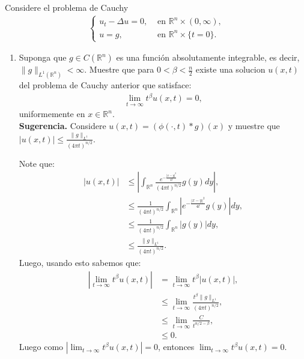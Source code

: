 \begin{homeworkProblem}
  Considere el problema de Cauchy
  \begin{align*}
    \begin{cases}
      u_t-\Delta u=0, &\text{ en } \mathbb{R}^{n}\times (0,\infty) \text{,} \\
      u=g, &\text{ en } \mathbb{R}^{n}\times\{t=0\} .
    \end{cases}
  \end{align*}
  \begin{enumerate}
    \item Suponga que $g\in C(\mathbb{R}^{n})$ es una función absolutamente integrable, es decir,$\|g\|_{L^1(\mathbb{R}^{n})}< \infty$. Muestre que para $0< \beta < \frac{n}{2}$ existe una solucion $u(x,t)$ del problema de Cauchy anterior que satisface:
    \begin{align*}
      \lim_{t\rightarrow\infty}t^{\beta}u(x,t)=0,
    \end{align*}
    uniformemente en $x\in\mathbb{R}^{n}$.\\
    \textbf{Sugerencia.} Considere $u(x,t)=(\phi(\cdot,t)*g)(x)$ y muestre que $|u(x,t)|\leq \frac{\|g\|_{L^1}}{(4\pi t)^{n/2}}$.
    \begin{solucion}
      Note que:
      \begin{align*}
        |u(x,t)|&\leq \left| \int_{\mathbb{R}^{n}}\frac{e^{-\frac{|x-y|^2}{4t}}}{(4\pi t)^{n/2}}g(y)dy \right|,\\
        &\leq \frac{1}{(4\pi t)^{n/2}}\int_{\mathbb{R}^{n}}\left| e^{-\frac{|x-y|^2}{4t}}g(y) \right|dy,\\
        &\leq \frac{1}{(4\pi t)^{n/2}}\int_{\mathbb{R}^{n}}\left| g(y) \right|dy,\\
        &\leq \frac{\|g\|_{L^1}}{(4\pi t)^{n/2}}.
      \end{align*}
      Luego, usando esto sabemos que:
      \begin{align*}
        |\lim_{t \rightarrow \infty}t^{\beta}u(x,t)|&=\lim_{t\rightarrow\infty}t^{\beta}|u(x,t)|,\\
        &\leq\lim_{t \rightarrow \infty}\frac{t^{\beta}\|g\|_{L^1}}{(4\pi t)^{n/2}},\\
        &\leq \lim_{t\rightarrow\infty} \frac{C}{t^{n/2-\beta}},\\
        &\leq 0.
      \end{align*}
      Luego como $|\lim_{t\rightarrow\infty}t^{\beta}u(x,t)|=0$, entonces $\lim_{t\rightarrow\infty}t^{\beta}u(x,t)=0$.
      \demostrado
    \end{solucion}
  \end{enumerate}  
\end{homeworkProblem}
